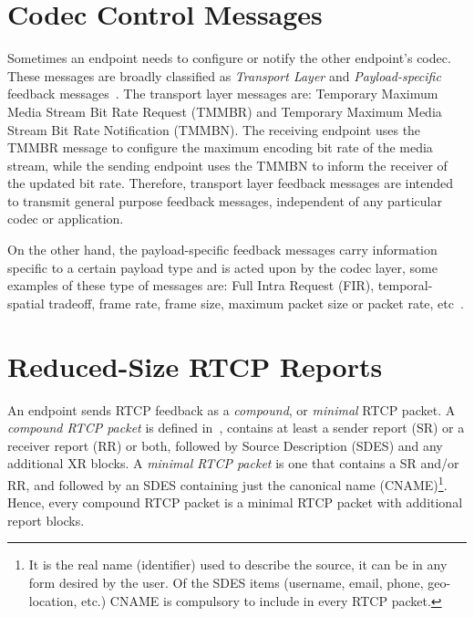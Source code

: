 

\section{Codec Control Messages}

Sometimes an endpoint needs to configure or notify the other endpoint's codec.
These messages are broadly classified as \emph{Transport Layer} and \emph
{Payload-specific} feedback messages~\cite{rfc4585, rfc5104}. The transport
layer messages are: Temporary Maximum Media Stream Bit Rate Request (TMMBR)
and Temporary Maximum Media Stream Bit Rate Notification (TMMBN). The
receiving endpoint uses the TMMBR message to configure the maximum encoding
bit rate of the media stream, while the sending endpoint uses the TMMBN to
inform the receiver of the updated bit rate. Therefore, transport layer
feedback messages are intended to transmit general purpose feedback messages,
independent of any particular codec or application.

On the other hand, the payload-specific feedback messages carry information
specific to a certain payload type and is acted upon by the codec layer, some
examples of these type of messages are: Full Intra Request (FIR), 
temporal-spatial tradeoff, frame rate, frame size, maximum packet size or packet rate,
etc~\cite{draft.avt.cop}.

\section{Reduced-Size RTCP Reports}

An endpoint sends RTCP feedback as a \emph{compound}, or \emph{minimal} RTCP
packet. A \emph{compound RTCP packet} is defined in~\cite{rfc3585}, contains
at least a sender report (SR) or a receiver report (RR) or both, followed by
Source Description (SDES) and any additional XR blocks. A \emph{minimal RTCP
packet} is one that contains a SR and/or RR, and followed by an SDES
containing just the canonical name (CNAME)\footnote{It is the real name
(identifier) used to describe the source, it can be in any form desired by the
user. Of the SDES items (username, email, phone, geo-location, etc.) CNAME is
compulsory to include in every RTCP packet.}. Hence, every compound RTCP
packet is a minimal RTCP packet with additional report blocks.

